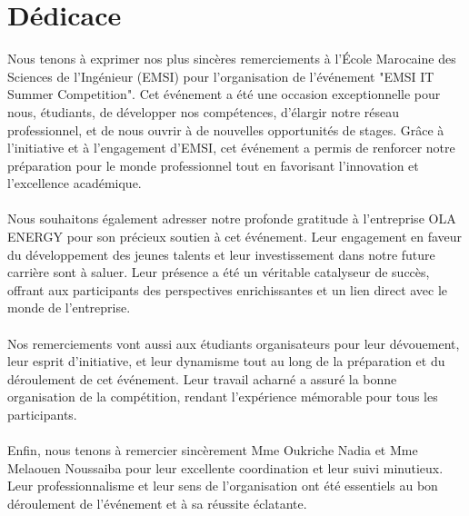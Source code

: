 \documentclass[a4paper, oneside, 12pt, final]{extreport}
\newcommand{\reportAuthor} {%
  Haitham \textsc{EL ABDIOUI}\\
  Aboubakr \textsc{KETOUN}%
}
\begin{document}
\chapter*{Dédicace}
\thispagestyle{empty}



Nous tenons à exprimer nos plus sincères remerciements à l'École Marocaine des Sciences de l'Ingénieur (EMSI) pour l'organisation de l'événement "EMSI IT Summer Competition". Cet événement a été une occasion exceptionnelle pour nous, étudiants, de développer nos compétences, d'élargir notre réseau professionnel, et de nous ouvrir à de nouvelles opportunités de stages. Grâce à l'initiative et à l'engagement d'EMSI, cet événement a permis de renforcer notre préparation pour le monde professionnel tout en favorisant l'innovation et l'excellence académique.
\\
\\
Nous souhaitons également adresser notre profonde gratitude à l'entreprise OLA ENERGY pour son précieux soutien à cet événement. Leur engagement en faveur du développement des jeunes talents et leur investissement dans notre future carrière sont à saluer. Leur présence a été un véritable catalyseur de succès, offrant aux participants des perspectives enrichissantes et un lien direct avec le monde de l'entreprise.
\\
\\
Nos remerciements vont aussi aux étudiants organisateurs pour leur dévouement, leur esprit d'initiative, et leur dynamisme tout au long de la préparation et du déroulement de cet événement. Leur travail acharné a assuré la bonne organisation de la compétition, rendant l'expérience mémorable pour tous les participants.
\\
\\
Enfin, nous tenons à remercier sincèrement Mme Oukriche Nadia et Mme Melaouen Noussaiba pour leur excellente coordination et leur suivi minutieux. Leur professionnalisme et leur sens de l'organisation ont été essentiels au bon déroulement de l'événement et à sa réussite éclatante.



%
%
\end{document}
